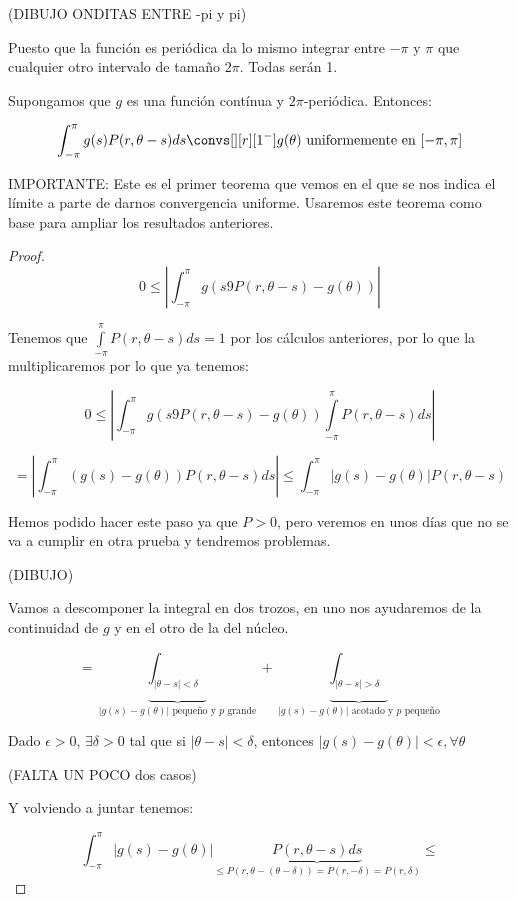 \begin{itemize}
			(DIBUJO ONDITAS ENTRE -pi y pi)

			Puesto que la función es periódica da lo mismo integrar entre $-\pi$ y $\pi$ que cualquier otro intervalo de tamaño $2\pi$. Todas serán 1.

			\begin{theorem}
				Supongamos que $g$ es una función contínua y $2\pi$-periódica. Entonces:

				\[ \int^\pi_{-\pi} g(s)P(r, \theta-s) ds \convs[][r][1^-] g(\theta) \text{ uniformemente en } [-\pi,\pi] \]

				IMPORTANTE: Este es el primer teorema que vemos en el que se nos indica el límite a parte de darnos convergencia uniforme. Usaremos este teorema como base para ampliar los resultados anteriores.

				\begin{proof}

					\[0 \leq \left| \int_{-\pi}^{\pi} g(s9 P(r, \theta-s) - g(\theta))  \right| \]

					Tenemos que $\int\limits_{-\pi}^{\pi} P(r, \theta-s) ds = 1$ por los cálculos anteriores, por lo que la multiplicaremos por lo que ya tenemos:

					\[0 \leq \left| \int_{-\pi}^{\pi} g(s9 P(r, \theta-s) - g(\theta))  \int\limits_{-\pi}^{\pi} P(r, \theta-s) ds  \right| \]

					\[ = \left| \int_{-\pi}^\pi (g(s) - g(\theta)) P(r, \theta - s) ds \right|  \leq \int^{\pi}_{-\pi} | g(s) - g(\theta) | P(r, \theta- s) \]

					Hemos podido hacer este paso ya que $P>0$, pero veremos en unos días que no se va a cumplir en otra prueba y tendremos problemas.


					(DIBUJO)

					Vamos a descomponer la integral en dos trozos, en uno nos ayudaremos de la continuidad de $g$ y en el otro de la del núcleo.

					\[ = \underbrace{\int_{|\theta-s|< \delta}}_{|g(s) - g(\theta)| \text{ pequeño y }p\text{ grande}} + \underbrace{\int_{|\theta-s| > \delta}}_{|g(s) - g(\theta)| \text{ acotado y }p\text{ pequeño}} \]

					Dado $\epsilon > 0$, $\exists \delta > 0$ tal que si $|\theta-s| < \delta$, entonces $|g(s) - g(\theta)| < \epsilon, \forall \theta$

					(FALTA UN POCO dos casos)

					Y volviendo a juntar tenemos:

					\[ \int^{\pi}_{-\pi} |g(s) - g(\theta) | \underbrace{P(r, \theta-s) ds}_{\leq P(r, \theta-(\theta-\delta)) = P(r, -\delta) = P(r, \delta)} \leq   \]


\end{proof}
\end{theorem}
\end{itemize}
